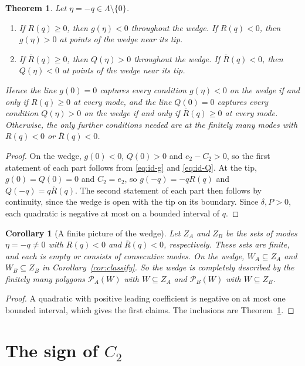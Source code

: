 \documentclass[11pt]{article}
\newtheorem{theorem}{Theorem}
\newtheorem{corollary}{Corollary}
\theoremstyle{definition}
\theoremstyle{remark}
\begin{document}
\begin{theorem}\label{thm:capture}
Let $\eta=-q\in\Lambda\setminus\{0\}$.
\begin{enumerate}
\item If $R(q)\ge0$, then $g(\eta)<0$ throughout the wedge. If $R(q)<0$, then $g(\eta)>0$ at points of the wedge near its tip.
\item If $\overline{R}(q)\ge0$, then $Q(\eta)>0$ throughout the wedge. If $\overline{R}(q)<0$, then $Q(\eta)<0$ at points of the wedge near its tip.
\end{enumerate}
Hence the line $g(0)=0$ captures every condition $g(\eta)<0$ on the wedge if and only if $R(q)\ge0$ at every mode, and the line $Q(0)=0$ captures every condition $Q(\eta)>0$ on the wedge if and only if $\overline{R}(q)\ge0$ at every mode. Otherwise, the only further conditions needed are at the finitely many modes with $R(q)<0$ or $\overline{R}(q)<0$.
\end{theorem}

\begin{proof}
On the wedge, $g(0)<0$, $Q(0)>0$ and $e_2-C_2>0$, so the first statement of each part follows from \eqref{eq:id-g} and \eqref{eq:id-Q}. At the tip, $g(0)=Q(0)=0$ and $C_2=e_2$, so $g(-q)=-qR(q)$ and $Q(-q)=q\overline{R}(q)$. The second statement of each part then follows by continuity, since the wedge is open with the tip on its boundary. Since $\delta,P>0$, each quadratic is negative at most on a bounded interval of $q$.
\end{proof}

\begin{corollary}[A finite picture of the wedge]\label{cor:finite}
Let $Z_A$ and $Z_B$ be the sets of modes $\eta=-q\neq0$ with $R(q)<0$ and $\overline{R}(q)<0$, respectively. These sets are finite, and each is empty or consists of consecutive modes. On the wedge, $W_A\subseteq Z_A$ and $W_B\subseteq Z_B$ in Corollary~\ref{cor:classify}. So the wedge is completely described by the finitely many polygons $\mathcal{P}_A(W)$ with $W\subseteq Z_A$ and $\mathcal{P}_B(W)$ with $W\subseteq Z_B$.
\end{corollary}

\begin{proof}
A quadratic with positive leading coefficient is negative on at most one bounded interval, which gives the first claims. The inclusions are Theorem~\ref{thm:capture}.
\end{proof}

\section{The sign of $C_2$}
\end{document}
